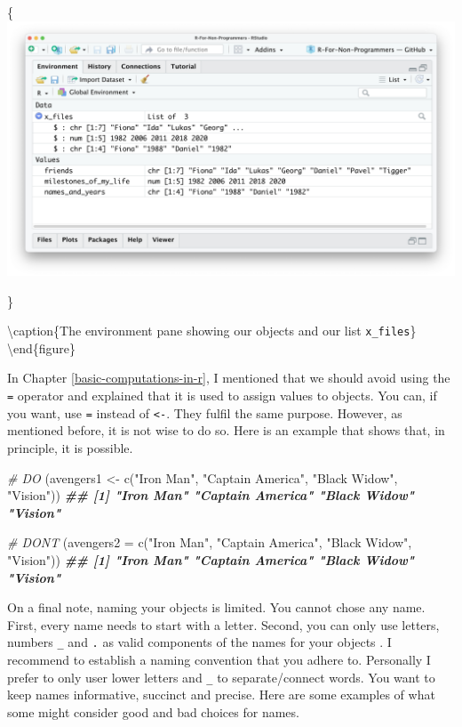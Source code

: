 \documentclass[
]{book}
\newenvironment{Shaded}{\begin{snugshade}}{\end{snugshade}}
\newcommand{\AttributeTok}[1]{\textcolor[rgb]{0.77,0.63,0.00}{#1}}
\newcommand{\CommentTok}[1]{\textcolor[rgb]{0.56,0.35,0.01}{\textit{#1}}}
\newcommand{\DocumentationTok}[1]{\textcolor[rgb]{0.56,0.35,0.01}{\textbf{\textit{#1}}}}
\newcommand{\FunctionTok}[1]{\textcolor[rgb]{0.00,0.00,0.00}{#1}}
\newcommand{\NormalTok}[1]{#1}
\newcommand{\OtherTok}[1]{\textcolor[rgb]{0.56,0.35,0.01}{#1}}
\newcommand{\StringTok}[1]{\textcolor[rgb]{0.31,0.60,0.02}{#1}}
\begin{document}
\{\centering \includegraphics[width=38.67in]{images/chapter_05_img/02_basic_computation_environment_lists}

\}

\textbackslash caption\{The environment pane showing our objects and our list \texttt{x\_files}\}\label{fig:img-x-files}
\textbackslash end\{figure\}

In Chapter \ref{basic-computations-in-r}, I mentioned that we should avoid using the \texttt{=} operator and explained that it is used to assign values to objects. You can, if you want, use \texttt{=} instead of \texttt{\textless{}-}. They fulfil the same purpose. However, as mentioned before, it is not wise to do so. Here is an example that shows that, in principle, it is possible.

\begin{Shaded}
\begin{Highlighting}[]
\CommentTok{\# DO}
\NormalTok{(avengers1 }\OtherTok{\textless{}{-}} \FunctionTok{c}\NormalTok{(}\StringTok{"Iron Man"}\NormalTok{, }\StringTok{"Captain America"}\NormalTok{, }\StringTok{"Black Widow"}\NormalTok{, }\StringTok{"Vision"}\NormalTok{))}
\DocumentationTok{\#\# [1] "Iron Man"        "Captain America" "Black Widow"     "Vision"}

\CommentTok{\# DON\textquotesingle{}T}
\NormalTok{(}\AttributeTok{avengers2 =} \FunctionTok{c}\NormalTok{(}\StringTok{"Iron Man"}\NormalTok{, }\StringTok{"Captain America"}\NormalTok{, }\StringTok{"Black Widow"}\NormalTok{, }\StringTok{"Vision"}\NormalTok{))}
\DocumentationTok{\#\# [1] "Iron Man"        "Captain America" "Black Widow"     "Vision"}
\end{Highlighting}
\end{Shaded}

On a final note, naming your objects is limited. You cannot chose any name. First, every name needs to start with a letter. Second, you can only use letters, numbers \texttt{\_} and \texttt{.} as valid components of the names for your objects \citep[see also][Chapter 4.2.]{wickham2016r}. I recommend to establish a naming convention that you adhere to. Personally I prefer to only user lower letters and \texttt{\_} to separate/connect words. You want to keep names informative, succinct and precise. Here are some examples of what some might consider good and bad choices for names.
\end{document}
